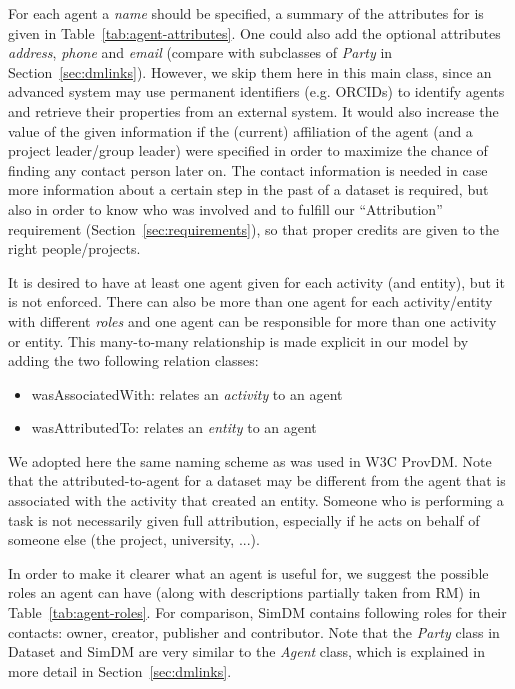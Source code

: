 For each agent a \emph{name} should be specified, a summary of the attributes for  is given in Table~\ref{tab:agent-attributes}.
One could also add the optional attributes \emph{address}, \emph{phone} and \emph{email} (compare with subclasses of \emph{Party} in Section~\ref{sec:dmlinks}). However, we skip them here in this main class, since an advanced system may use permanent identifiers (e.g. ORCIDs) to identify agents and retrieve their properties from an external system.
It would also increase the value of the given
information if the (current) affiliation of the agent (and a project leader/group
leader) were specified in order to maximize the chance of finding any contact 
person later on. 
The contact information is needed in case more information about a certain step in the past of a dataset is required,
but also in order
to know who was involved and to fulfill our ``Attribution'' requirement 
(Section~\ref{sec:requirements}), so that proper credits are given to the right 
people/projects. 



It is desired to have at least one agent given for each activity (and entity), but it
is not enforced.
There can also be more than one agent for each activity/entity with different \emph{roles} 
and one agent can be responsible for more than one activity or entity. This 
many-to-many relationship is made explicit in our model by adding the two
following relation classes:

\begin{itemize}
\item wasAssociatedWith: relates an \emph{activity} to an agent
\item wasAttributedTo: relates an \emph{entity} to an agent
\end{itemize}

We adopted here the same naming scheme as was used in W3C ProvDM.
Note that the attributed-to-agent for a dataset may be different from the 
agent that is associated with the activity that created an entity.
Someone who is performing a task is not necessarily given full attribution, 
especially if he acts on behalf of someone else (the project, university, ...).


In order to make it clearer what an agent is useful for, we suggest the
possible roles an agent can have (along with descriptions partially taken from RM)
in Table~\ref{tab:agent-roles}.
For comparison, SimDM contains following roles for their contacts:
owner, creator, publisher and contributor. Note that the \emph{Party} class in Dataset and SimDM are very similar to the \emph{Agent} class, which is explained in more detail in Section~\ref{sec:dmlinks}.


